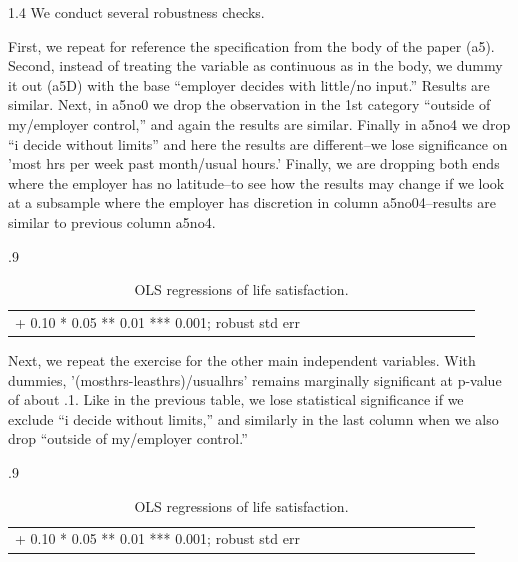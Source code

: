 \documentclass[10pt, letterpaper]{article}
\begin{document}
\begin{spacing}{1.4}
We conduct several robustness checks.

First, we repeat for reference the specification from the body of the
paper (a5). Second, instead of treating the variable as continuous as in the body, we
dummy it out (a5D) with the base ``employer decides with little/no input.'' Results
are similar. Next, in a5no0 we drop the observation in the 1st category ``outside of
my/employer control,'' and again the results are similar. Finally in a5no4 we drop ``i
decide without limits'' and here the results are different--we lose significance on 'most hrs per week past month/usual hours.' Finally, we are dropping both ends where the employer has no latitude--to see how the results may change if we look at a subsample where the  employer has discretion in column a5no04--results are similar to previous column a5no4.  

\begin{spacing}{.9} \begin{table}[H]\centering   \begin{scriptsize} \begin{tabular}{p{1.8in}p{.5in}p{.5in}p{.5in}p{.5in}p{.5in}p{.5in}p{.5in}p{.5in}p{.5in}p{.5 in}p{.5in}p{.5 in}}\hline  \hline + 0.10 * 0.05 ** 0.01 *** 0.001; robust std err \end{tabular}\end{scriptsize}\caption{\label{a5}OLS regressions of life satisfaction.}\end{table} \end{spacing}

Next, we repeat the exercise for the other main independent variables. With dummies,
'(mosthrs-leasthrs)/usualhrs' remains marginally significant at p-value of
about .1. Like in the previous table, we lose statistical significance if we exclude
 ``i decide without limits,'' and similarly in the last column when we also drop ``outside of
my/employer control.''

\begin{spacing}{.9} \begin{table}[H]\centering   \begin{scriptsize} \begin{tabular}{p{1.8in}p{.5in}p{.5in}p{.5in}p{.5in}p{.5in}p{.5in}p{.5in}p{.5in}p{.5in}p{.5 in}p{.5in}p{.5 in}}\hline  \hline + 0.10 * 0.05 ** 0.01 *** 0.001; robust std err \end{tabular}\end{scriptsize}\caption{\label{b5}OLS regressions of life satisfaction.}\end{table} \end{spacing}


\end{spacing}
\end{document}
